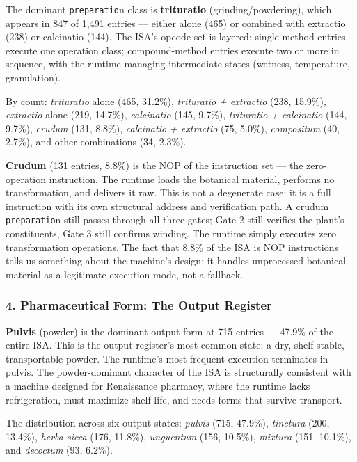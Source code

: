 The dominant \texttt{preparatio}n class is \textbf{trituratio}
(grinding/powdering), which appears in 847 of 1,491 entries --- either
alone (465) or combined with extractio (238) or calcinatio (144). The
ISA's opcode set is layered: single-method entries execute one operation
class; compound-method entries execute two or more in sequence, with the
runtime managing intermediate states (wetness, temperature,
granulation).

By count: \emph{trituratio} alone (465, 31.2\%), \emph{trituratio +
extractio} (238, 15.9\%), \emph{extractio} alone (219, 14.7\%),
\emph{calcinatio} (145, 9.7\%), \emph{trituratio + calcinatio} (144,
9.7\%), \emph{crudum} (131, 8.8\%), \emph{calcinatio + extractio} (75,
5.0\%), \emph{compositum} (40, 2.7\%), and other combinations (34,
2.3\%).

\textbf{Crudum} (131 entries, 8.8\%) is the NOP of the instruction set
--- the zero-operation instruction. The runtime loads the botanical
material, performs no transformation, and delivers it raw. This is not a
degenerate case: it is a full instruction with its own structural
address and verification path. A crudum \texttt{preparatio}n still
passes through all three gates; Gate 2 still verifies the plant's
constituents, Gate 3 still confirms winding. The runtime simply executes
zero transformation operations. The fact that 8.8\% of the ISA is NOP
instructions tells us something about the machine's design: it handles
unprocessed botanical material as a legitimate execution mode, not a
fallback.

\hypertarget{pharmaceutical-form-the-output-register}{%
\subsubsection{4. Pharmaceutical Form: The Output
Register}\label{pharmaceutical-form-the-output-register}}

\textbf{Pulvis} (powder) is the dominant output form at 715 entries ---
47.9\% of the entire ISA. This is the output register's most common
state: a dry, shelf-stable, transportable powder. The runtime's most
frequent execution terminates in pulvis. The powder-dominant character
of the ISA is structurally consistent with a machine designed for
Renaissance pharmacy, where the runtime lacks refrigeration, must
maximize shelf life, and needs forms that survive transport.

The distribution across six output states: \emph{pulvis} (715, 47.9\%),
\emph{tinctura} (200, 13.4\%), \emph{herba sicca} (176, 11.8\%),
\emph{unguentum} (156, 10.5\%), \emph{mixtura} (151, 10.1\%), and
\emph{decoctum} (93, 6.2\%).

